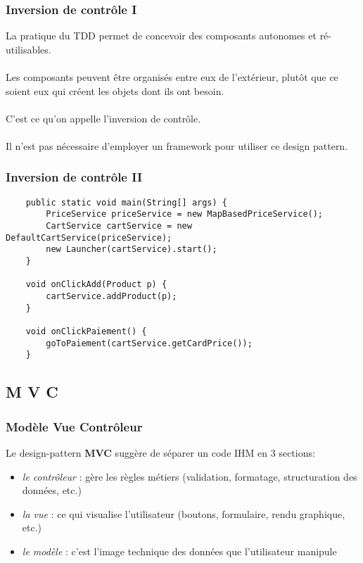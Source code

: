 \begin{frame}[fragile]
	\frametitle{Inversion de contr\^{o}le I}

    La pratique du TDD permet de concevoir des composants autonomes et r\'{e}-utilisables.
    \\~\\
    Les composants peuvent \^{e}tre organis\'{e}s entre eux de l'ext\'{e}rieur, plut\^{o}t que ce soient eux qui cr\'{e}ent les objets dont ils ont besoin.
    \\~\\
    C'est ce qu'on appelle l'inversion de contr\^{o}le.
    \\~\\
    Il n'est pas n\'{e}cessaire d'employer un framework pour utiliser ce design pattern.
\end{frame}

\begin{frame}[fragile]
	\frametitle{Inversion de contr\^{o}le II}

    \begin{lstlisting}
	public static void main(String[] args) {
		PriceService priceService = new MapBasedPriceService();
		CartService cartService = new DefaultCartService(priceService);
		new Launcher(cartService).start();
	}

	void onClickAdd(Product p) {
		cartService.addProduct(p);
	}

	void onClickPaiement() {
		goToPaiement(cartService.getCardPrice());
	}
	\end{lstlisting}
\end{frame}

\subsection{M V C}

\begin{frame}[fragile]
	\frametitle{Mod\`{e}le Vue Contr\^{o}leur}

    Le design-pattern \textbf{MVC} sugg\`{e}re de s\'{e}parer un code IHM en 3 sections:

	\begin{itemize}
		\item \textit{le contr\^{o}leur} : g\`{e}re les r\`{e}gles m\'{e}tiers (validation, formatage, structuration des donn\'{e}es, etc.)
		\item \textit{la vue} : ce qui visualise l'utilisateur (boutons, formulaire, rendu graphique, etc.)
		\item \textit{le mod\`{e}le} :  c'est l'image technique des donn\'{e}es que l'utilisateur manipule
 	\end{itemize}  
\end{frame}

